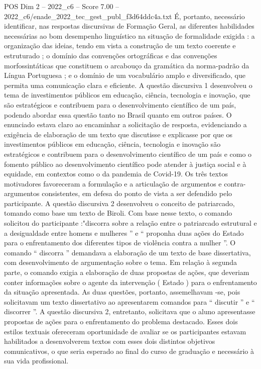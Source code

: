 \begin{textsample}{POS Dim 2 – 2022\_c6 – Score 7.00 – 2022\_c6/enade\_2022\_tec\_gest\_publ\_f3d64ddc4a.txt}
É, portanto, necessário identificar, nas respostas discursivas de Formação Geral, as diferentes habilidades necessárias ao bom desempenho linguístico na situação de formalidade exigida : a organização das ideias, tendo em vista a construção de um texto coerente e estruturado ; o domínio das convenções ortográficas e das convenções morfossintáticas que constituem o arcabouço da gramática da norma-padrão da Língua Portuguesa ; e o domínio de um vocabulário amplo e diversificado, que permita uma comunicação clara e eficiente.
A questão discursiva 1 desenvolveu o tema de investimentos públicos em educação, ciência, tecnologia e inovação, que são estratégicos e contribuem para o desenvolvimento científico de um país, podendo abordar essa questão tanto no Brasil quanto em outros países.
O enunciado estava claro ao encaminhar a solicitação de resposta, evidenciando a exigência de elaboração de um texto que discutisse e explicasse por que os investimentos públicos em educação, ciência, tecnologia e inovação são estratégicos e contribuem para o desenvolvimento científico de um país e como o fomento público ao desenvolvimento científico pode atender à justiça social e à equidade, em contextos como o da pandemia de Covid-19.
Os três textos motivadores favoreceram a formulação e a articulação de argumentos e contra-argumentos consistentes, em defesa do ponto de vista a ser defendido pelo participante.
A questão discursiva 2 desenvolveu o conceito de patriarcado, tomando como base um texto de Biroli.
Com base nesse texto, o comando solicitou do participante :"discorra sobre a relação entre o patriarcado estrutural e a desigualdade entre homens e mulheres ” e “ proponha duas ações do Estado para o enfrentamento dos diferentes tipos de violência contra a mulher ”.
O comando “ discorra ” demandava a elaboração de um texto de base dissertativa, com desenvolvimento de argumentação sobre o tema.
Em relação à segunda parte, o comando exigia a elaboração de duas propostas de ações, que deveriam conter informações sobre o agente da intervenção ( Estado ) para o enfrentamento da situação apresentada.
As duas questões, portanto, assemelhavam -se, pois solicitavam um texto dissertativo ao apresentarem comandos para “ discutir ” e “ discorrer ”.
A questão discursiva 2, entretanto, solicitava que o aluno apresentasse propostas de ações para o enfrentamento do problema destacado.
Esses dois estilos textuais ofereceram oportunidade de avaliar se os participantes estavam habilitados a desenvolverem textos com esses dois distintos objetivos comunicativos, o que seria esperado ao final do curso de graduação e necessário à sua vida profissional.

\end{textsample}
